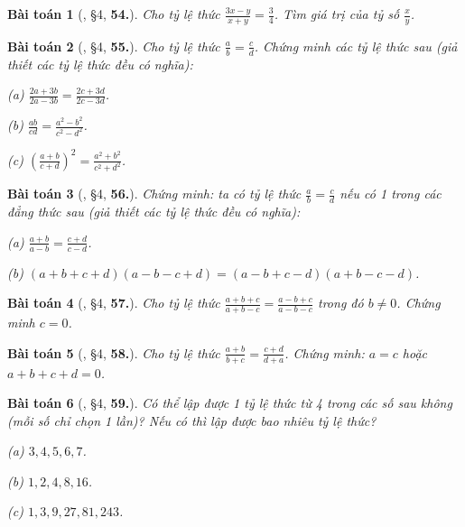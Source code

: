 \documentclass{article}
\numberwithin{equation}{section}
\newtheorem{baitoan}{Bài toán}
\begin{document}
\begin{baitoan}[\cite{Binh_Toan_7_tap_1}, \S4, \textbf{54.}]
	Cho tỷ lệ thức $\frac{3x - y}{x + y} = \frac{3}{4}$. Tìm giá trị của tỷ số $\frac{x}{y}$.
\end{baitoan}

\begin{baitoan}[\cite{Binh_Toan_7_tap_1}, \S4, \textbf{55.}]
	Cho tỷ lệ thức $\frac{a}{b} = \frac{c}{d}$. Chứng minh các tỷ lệ thức sau (giả thiết các tỷ lệ thức đều có nghĩa):
	\begin{enumerate*}
		\item[(a)] $\frac{2a + 3b}{2a - 3b} = \frac{2c + 3d}{2c - 3d}$.
		\item[(b)] $\frac{ab}{cd} = \frac{a^2 - b^2}{c^2 - d^2}$.
		\item[(c)] $\left(\frac{a + b}{c + d}\right)^2 = \frac{a^2 + b^2}{c^2 + d^2}$.
	\end{enumerate*}
\end{baitoan}

\begin{baitoan}[\cite{Binh_Toan_7_tap_1}, \S4, \textbf{56.}]
	Chứng minh: ta có tỷ lệ thức $\frac{a}{b} = \frac{c}{d}$ nếu có 1 trong các đẳng thức sau (giả thiết các tỷ lệ thức đều có nghĩa):
	\begin{enumerate*}
		\item[(a)] $\frac{a + b}{a - b} = \frac{c + d}{c - d}$.
		\item[(b)] $(a + b + c + d)(a - b - c + d) = (a - b + c - d)(a + b - c - d)$.
	\end{enumerate*}
\end{baitoan}

\begin{baitoan}[\cite{Binh_Toan_7_tap_1}, \S4, \textbf{57.}]
	Cho tỷ lệ thức $\frac{a + b + c}{a + b - c} = \frac{a - b + c}{a - b - c}$ trong đó $b\ne 0$. Chứng minh $c = 0$.
\end{baitoan}

\begin{baitoan}[\cite{Binh_Toan_7_tap_1}, \S4, \textbf{58.}]
	Cho tỷ lệ thức $\frac{a + b}{b + c} = \frac{c + d}{d + a}$. Chứng minh: $a = c$ hoặc $a + b + c + d = 0$.
\end{baitoan}

\begin{baitoan}[\cite{Binh_Toan_7_tap_1}, \S4, \textbf{59.}]
	Có thể lập được 1 tỷ lệ thức từ 4 trong các số sau không (mỗi số chỉ chọn 1 lần)? Nếu có thì lập được bao nhiêu tỷ lệ thức?
	\begin{enumerate*}
		\item[(a)] $3,4,5,6,7$.
		\item[(b)] $1,2,4,8,16$.
		\item[(c)] $1,3,9,27,81,243$.
	\end{enumerate*}
\end{baitoan}
\end{document}
